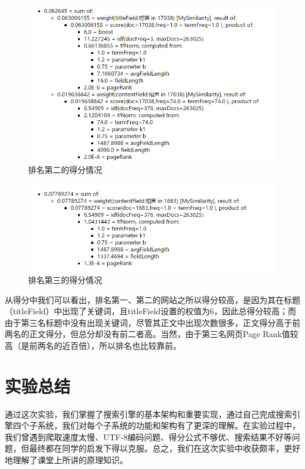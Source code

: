 \documentclass[paper=a4, fontsize=11pt, UTF8]{article} %
\numberwithin{equation}{section} %
\numberwithin{figure}{section} %
\numberwithin{table}{section} %
\begin{document}
\begin{figure}[htp]
\center
\includegraphics[scale=0.5]{t2}
\caption{排名第二的得分情况}
\end{figure}

\begin{figure}[htp]
\center
\includegraphics[scale=0.5]{t3}
\caption{排名第三的得分情况}
\end{figure}

\newpage

从得分中我们可以看出，排名第一、第二的网站之所以得分较高，是因为其在标题（titleField）中出现了关键词，且titleField设置的权值为6，因此总得分较高；而由于第三名标题中没有出现关键词，尽管其正文中出现次数很多，正文得分高于前两名的正文得分，但总分却没有前二者高。当然，由于第三名网页Page Rank值较高（是前两名的近百倍），所以排名也比较靠前。

\section{实验总结}

通过这次实验，我们掌握了搜索引擎的基本架构和重要实现，通过自己完成搜索引擎四个子系统，我们对每个子系统的功能和架构有了更深的理解。在实验过程中，我们曾遇到爬取速度太慢、UTF-8编码问题、得分公式不够优、搜索结果不好等问题，但最终都在同学的启发下得以克服。总之，我们在这次实验中收获颇丰，更好地理解了课堂上所讲的原理知识。
\end{document}
